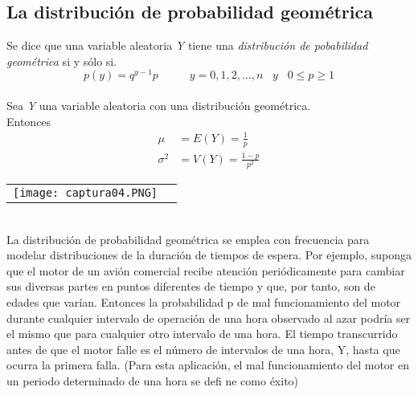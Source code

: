 \documentclass[10pt]{article}\usepackage[]{graphicx}\usepackage[]{color}
\begin{document}
\subsection{La distribución de probabilidad geométrica}
Se dice que una variable aleatoria \textit{Y} tiene una \textit{distribución de pobabilidad geométrica} si y sólo si.
\begin{equation*}
p(y)=q^{y-1}p\; \; \; \; \; \; \; \; \; \;     y=0,1,2,...,n \;\; \;y \; \; \;0\leq p \geq 1
\end{equation*}\\
Sea \textit{Y} una variable aleatoria con una distribución geométrica.\\
Entonces
\begin{align*}
\mu&=E(Y)=\frac{1}{p}\\
\sigma^2&=V(Y)=\frac{1-p}{p^2}
\end{align*}
\begin{tabular}{p{} p{} }
\texttt{[image: captura04.PNG]}
\end{tabular}\\
La distribución de probabilidad geométrica se emplea con frecuencia para modelar distribuciones de la duración de tiempos de espera. Por ejemplo, suponga que el motor de un 
avión comercial recibe atención periódicamente para cambiar sus diversas partes en puntos 
diferentes de tiempo y que, por tanto, son de edades que varían. Entonces la probabilidad p
de mal funcionamiento del motor durante cualquier intervalo de operación de una hora observado al azar podría ser el mismo que para cualquier otro intervalo de una hora. El tiempo 
transcurrido antes de que el motor falle es el número de intervalos de una hora, Y, hasta que 
ocurra la primera falla. (Para esta aplicación, el mal funcionamiento del motor en un periodo 
determinado de una hora se defi ne como éxito)
\end{document}
